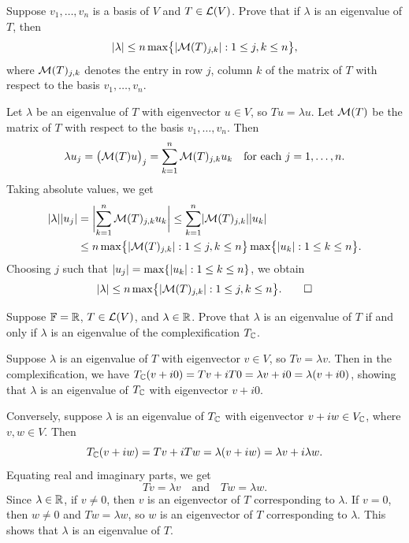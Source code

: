 \begin{exc}
\begin{exercise}
Suppose $v_1,\dots,v_n$ is a basis of $V$ and $T\in\mathcal{L}(V)$. Prove that if
$\lambda$ is an eigenvalue of $T$, then
\[ \lvert \lambda \rvert \le n\max\bigl\{\lvert \mathcal{M}(T)_{j,k} \rvert : 1\le j,k\le n\bigr\}, \]
where $\mathcal{M}(T)_{j,k}$ denotes the entry in row $j$, column $k$ of the matrix of
$T$ with respect to the basis $v_1,\dots,v_n$.
\end{exercise}
\begin{solution}
Let $\lambda$ be an eigenvalue of $T$ with eigenvector $u\in V$, so
$Tu=\lambda u$. Let $\mathcal{M}(T)$ be the matrix of $T$ with respect to the basis
$v_1,\dots,v_n$. Then
\[ \lambda u_j = \bigl(\mathcal{M}(T)u\bigr)_j = \sum_{k=1}^n\mathcal{M}(T)_{j,k}u_k
   \quad\text{for each } j=1,\dots,n. \]
Taking absolute values, we get
\begin{align*}
\lvert \lambda \rvert\lvert u_j \rvert
  &= \biggl\lvert\sum_{k=1}^n\mathcal{M}(T)_{j,k}u_k\biggr\rvert
   \le \sum_{k=1}^n\lvert \mathcal{M}(T)_{j,k} \rvert\lvert u_k \rvert\\
  &\le n\max\bigl\{\lvert \mathcal{M}(T)_{j,k} \rvert : 1\le j,k\le n\bigr\}
   \max\bigl\{\lvert u_k \rvert : 1\le k\le n\bigr\}.
\end{align*}
Choosing $j$ such that $\lvert u_j \rvert=\max\{\lvert u_k \rvert : 1\le k\le n\}$, we obtain
\[ \lvert \lambda \rvert \le n\max\bigl\{\lvert \mathcal{M}(T)_{j,k} \rvert : 1\le j,k\le n\bigr\}.
   \qedhere \]
\end{solution}

\begin{exercise}
Suppose $\mathbb{F}=\mathbb{R}$, $T\in\mathcal{L}(V)$, and $\lambda\in\mathbb{R}$. Prove that $\lambda$ is an
eigenvalue of $T$ if and only if $\lambda$ is an eigenvalue of the
complexification $T_{\mathbb{C}}$.
\end{exercise}
\begin{solution}
Suppose $\lambda$ is an eigenvalue of $T$ with eigenvector $v\in V$, so
$Tv=\lambda v$. Then in the complexification, we have
$T_{\mathbb{C}}(v+i0)=Tv+iT0=\lambda v+i0=\lambda(v+i0)$, showing that $\lambda$ is an
eigenvalue of $T_{\mathbb{C}}$ with eigenvector $v+i0$.

Conversely, suppose $\lambda$ is an eigenvalue of $T_{\mathbb{C}}$ with eigenvector
$v+iw\in V_{\mathbb{C}}$, where $v,w\in V$. Then
\[ T_{\mathbb{C}}(v+iw) = Tv+iTw = \lambda(v+iw) = \lambda v+i\lambda w. \]
Equating real and imaginary parts, we get
\[ Tv=\lambda v \quad\text{and}\quad Tw=\lambda w. \]
Since $\lambda\in\mathbb{R}$, if $v\ne0$, then $v$ is an eigenvector of $T$
corresponding to $\lambda$. If $v=0$, then $w\ne0$ and $Tw=\lambda w$, so $w$
is an eigenvector of $T$ corresponding to $\lambda$. This shows that $\lambda$
is an eigenvalue of $T$.
\end{solution}


\end{exc}
